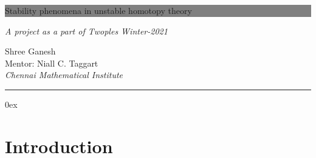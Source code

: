 \documentclass[12pt]{extarticle}
\numberwithin{equation}{section}
\begin{document}
\date{\today}
\begin{titlepage}
    \selectfont%
	
	
	\colorbox{grey}{
		\parbox[t]{0.93\textwidth}{ %
			\parbox[t]{0.91\textwidth}{ %
				\centering %
				\fontsize{30pt}{30pt}\selectfont %
				\vspace{0.7cm} %
				
				Stability phenomena in unstable homotopy theory\\
				
				\vspace{0.7cm} %
			}
		}
	}
	\vspace{1cm}
	\begin{center}
	    \textit{\large A project as a part of Twoples Winter-2021}
	
	\end{center} %
	\vfill
	
	
	\parbox[t]{0.93\textwidth}{ %
		\raggedleft %
		\large %
		{ {\Large Shree Ganesh}\\[4pt]
		Mentor: Niall C. Taggart\\[4pt]
		\it{Chennai Mathematical Institute}}
		
		\rule{0.2\linewidth}{1pt}%
	}
	
\end{titlepage}

\thispagestyle{empty}


\clearpage
{}

\tableofcontents
\thispagestyle{empty}
\clearpage

\pagestyle{fancy}
\parindent 0ex
\section{Introduction}
\end{document}
